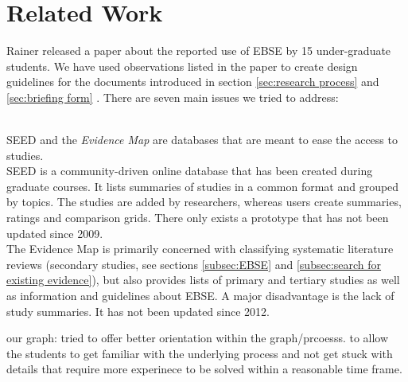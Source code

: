 
\section{Related Work}
\label{sec:related work}

Rainer \etal \cite{Rainer2006} released a paper about the reported use of EBSE by 15 under-graduate students. 
We have used observations listed in the paper to create design guidelines for the documents introduced in section \ref{sec:research process} and \ref{sec:briefing form} . There are seven main issues we tried to address:


\\

SEED \cite{Janzen2008} and the \emph{Evidence Map} \cite{EBSEWeb} are databases that are meant to ease the access to studies.\\ 
SEED is a community-driven online database that has been created during graduate courses. It lists summaries of studies in a common format and grouped by topics. The studies are added by researchers, whereas users create summaries, ratings and comparison grids. There only exists a prototype \cite{SEED} that has not been updated since 2009.\\
The Evidence Map is primarily concerned with  classifying systematic literature reviews (secondary studies, see sections \ref{subsec:EBSE} and \ref{subsec:search for existing evidence}), but also provides lists of primary and tertiary studies as well as information and guidelines about EBSE. A major disadvantage is the lack of study summaries. It has not been updated since 2012.

 \cite{Rainer2008}
our graph: tried to offer better orientation within the graph/prcoesss. to allow the students to get familiar with the underlying process and not get stuck with details that require more experinece to be solved within a reasonable time frame.